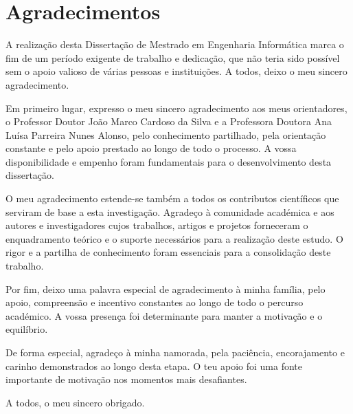 \chapter*{Agradecimentos}
\setlength{\parskip}{1em}

A realização desta Dissertação de Mestrado em Engenharia Informática marca o fim de um período exigente de trabalho e dedicação, que não teria sido possível sem o apoio valioso de várias pessoas e instituições. A todos, deixo o meu sincero agradecimento.

Em primeiro lugar, expresso o meu sincero agradecimento aos meus orientadores, o Professor Doutor João Marco Cardoso da Silva e a Professora Doutora Ana Luísa Parreira Nunes Alonso, pelo conhecimento partilhado, pela orientação constante e pelo apoio prestado ao longo de todo o processo. A vossa disponibilidade e empenho foram fundamentais para o desenvolvimento desta dissertação.

O meu agradecimento estende-se também a todos os contributos científicos que serviram de base a esta investigação. Agradeço à comunidade académica e aos autores e investigadores cujos trabalhos, artigos e projetos forneceram o enquadramento teórico e o suporte necessários para a realização deste estudo. O rigor e a partilha de conhecimento foram essenciais para a consolidação deste trabalho.

Por fim, deixo uma palavra especial de agradecimento à minha família, pelo apoio, compreensão e incentivo constantes ao longo de todo o percurso académico. A vossa presença foi determinante para manter a motivação e o equilíbrio.

De forma especial, agradeço à minha namorada, pela paciência, encorajamento e carinho demonstrados ao longo desta etapa. O teu apoio foi uma fonte importante de motivação nos momentos mais desafiantes.

A todos, o meu sincero obrigado.

\setlength{\parskip}{0em}
